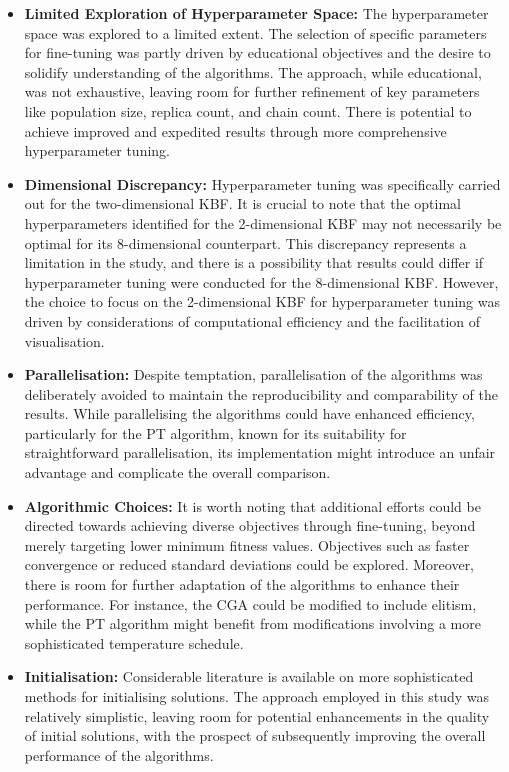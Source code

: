 \documentclass[10pt]{article}
\begin{document}
\begin{multicols}{2}
\begin{itemize}
    \item \textbf{Limited Exploration of Hyperparameter Space:} The hyperparameter space was explored to a limited extent. The selection of specific parameters for fine-tuning was partly driven by educational objectives and the desire to solidify understanding of the algorithms. The approach, while educational, was not exhaustive, leaving room for further refinement of key parameters like population size, replica count, and chain count. There is potential to achieve improved and expedited results through more comprehensive hyperparameter tuning.
    \item \textbf{Dimensional Discrepancy:} Hyperparameter tuning was specifically carried out for the two-dimensional KBF. It is crucial to note that the optimal hyperparameters identified for the 2-dimensional KBF may not necessarily be optimal for its 8-dimensional counterpart. This discrepancy represents a limitation in the study, and there is a possibility that results could differ if hyperparameter tuning were conducted for the 8-dimensional KBF. However, the choice to focus on the 2-dimensional KBF for hyperparameter tuning was driven by considerations of computational efficiency and the facilitation of visualisation.
    \item \textbf{Parallelisation:} Despite temptation, parallelisation of the algorithms was deliberately avoided to maintain the reproducibility and comparability of the results. While parallelising the algorithms could have enhanced efficiency, particularly for the PT algorithm, known for its suitability for straightforward parallelisation, its implementation might introduce an unfair advantage and complicate the overall comparison.
    \item \textbf{Algorithmic Choices:} It is worth noting that additional efforts could be directed towards achieving diverse objectives through fine-tuning, beyond merely targeting lower minimum fitness values. Objectives such as faster convergence or reduced standard deviations could be explored. Moreover, there is room for further adaptation of the algorithms to enhance their performance. For instance, the CGA could be modified to include elitism, while the PT algorithm might benefit from modifications involving a more sophisticated temperature schedule.
    \item \textbf{Initialisation:} Considerable literature is available on more sophisticated methods for initialising solutions. The approach employed in this study was relatively simplistic, leaving room for potential enhancements in the quality of initial solutions, with the prospect of subsequently improving the overall performance of the algorithms.

\end{itemize}
\end{multicols}
\end{document}
